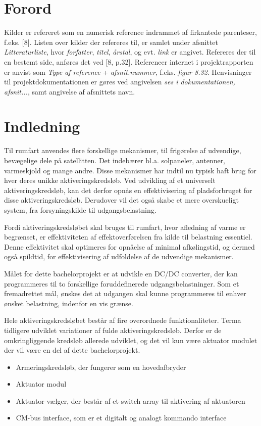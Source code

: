 
\chapter*{Forord} 

Kilder er refereret som en numerisk reference indrammet af firkantede parenteser, f.eks. [8]. Listen over kilder der refereres til, er samlet under afsnittet \textit{Litteraturliste}, hvor \textit{forfatter}, \textit{titel}, \textit{årstal}, og evt. \textit{link} er angivet. Refereres der til en bestemt side, anføres det ved [8, p.32]. Referencer internet i projektrapporten er anvist som \textit{Type af reference} + \textit{afsnit.nummer}, f.eks. \textit{figur 8.32}. Henvisninger til projektdokumentationen er gøres ved  angivelsen \textit{ses i dokumentationen, afsnit...}, samt angivelse af afsnittets navn.


{\let\clearpage\relax \chapter{Indledning}}
Til rumfart anvendes flere forskellige mekanismer, til frigørelse af udvendige, bevægelige dele på satellitten. Det indebærer bl.a. solpaneler, antenner, varmeskjold og mange andre. Disse mekanismer har indtil nu typisk haft brug for hver deres unikke aktiveringskredsløb. Ved udvikling af et universelt aktiveringskredsløb, kan det derfor opnås en effektivisering af pladsforbruget for disse aktiveringskredsløb. Derudover vil det også skabe et mere overskueligt system, fra forsyningskilde til udgangsbelastning. 

Fordi aktiveringskredsløbet skal bruges til rumfart, hvor afledning af varme er begrænset, er effektiviteten af effektoverførelsen fra kilde til belastning essentiel. Denne effektivitet skal optimeres for opnåelse af minimal afkølingstid, og dermed også spildtid, for effektivisering af udfoldelse af de udvendige mekanismer\cite{projekt-oplag}. 

Målet for dette bachelorprojekt er at udvikle en DC/DC converter, der kan programmeres til to forskellige foruddefinerede udgangsbelastninger. Som et fremadrettet mål, ønskes det at udgangen skal kunne programmeres til enhver ønsket belastning, indenfor en vis grænse. 

Hele aktiveringskredsløbet består af fire overordnede funktionaliteter. Terma tidligere udviklet variationer af fulde aktiveringskredsløb. Derfor er de omkringliggende kredsløb allerede udviklet, og det vil kun være aktuator modulet der vil være en del af dette bachelorprojekt.
\begin{itemize}
	\item Armeringskredsløb, der fungerer som en hovedafbryder
	\item Aktuator modul
	\item Aktuator-vælger, der består af et switch array til aktivering af aktuatoren
	\item CM-bus interface, som er et digitalt og analogt kommando interface
\end{itemize}


